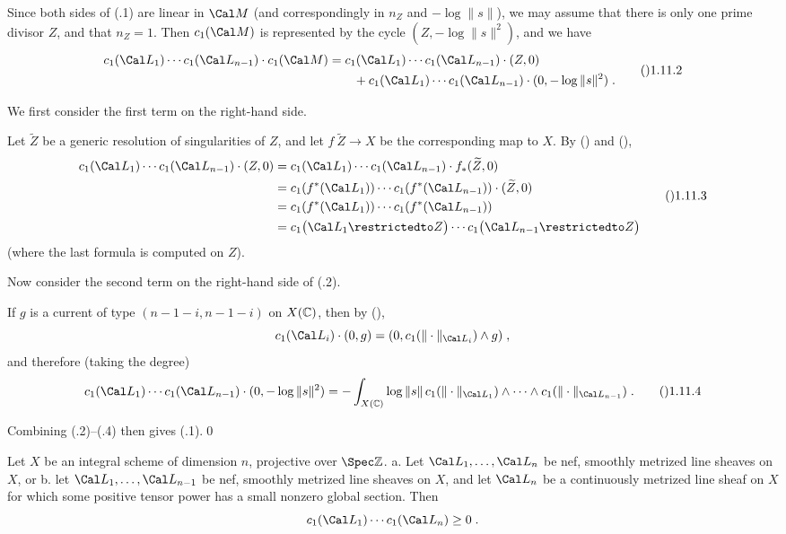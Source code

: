   Since both sides of (.1) are linear in $\Cal M$
(and correspondingly in $n_Z$ and $-\log\|s\|$), we may assume that
there is only one prime divisor $Z$, and that $n_Z=1$.  Then $c_1(\Cal M)$
is represented by the cycle $(Z,-\log\|s\|^2)$, and we have
$$\split c_1(\Cal L_1)\dotsm c_1(\Cal L_{n-1})\cdot c_1(\Cal M)
  &= c_1(\Cal L_1)\dotsm c_1(\Cal L_{n-1})\cdot (Z,0) \\
    &\qquad+ c_1(\Cal L_1)\dotsm c_1(\Cal L_{n-1})
      \cdot (0,-\log\|s\|^2)\;.\endsplit\tag\01.11.2$$

We first consider the first term on the right-hand side.

Let $\widetilde Z$ be a generic resolution of singularities of $Z$,
and let $f\:\widetilde Z\to X$ be the corresponding map to $X$.
By () and (),
$$\split c_1(\Cal L_1)\dotsm c_1(\Cal L_{n-1})\cdot (Z,0)
  &= c_1(\Cal L_1)\dotsm c_1(\Cal L_{n-1})\cdot f_{*}(\widetilde Z,0)\\
  &= c_1(f^{*}(\Cal L_1))\dotsm c_1(f^{*}(\Cal L_{n-1}))
    \cdot (\widetilde Z,0) \\
  &= c_1(f^{*}(\Cal L_1))\dotsm c_1(f^{*}(\Cal L_{n-1})) \\
  &= c_1\bigl(\Cal L_1\restrictedto Z\bigr) \dotsm
    c_1\bigl(\Cal L_{n-1}\restrictedto Z\bigr)\endsplit\tag\01.11.3$$
(where the last formula is computed on $Z$).

Now consider the second term on the right-hand side of (.2).

If $g$ is a current of type $(n-1-i,n-1-i)$ on $X(\Bbb C)$, then
by (),
$$c_1(\Cal L_i)\cdot(0,g) = (0,c_1(\|\cdot\|_{\Cal L_i})\wedge g)\;,$$
and therefore (taking the degree)
$$c_1(\Cal L_1)\dotsm c_1(\Cal L_{n-1}) \cdot (0,-\log\|s\|^2)
  = -\int_{X(\Bbb C)} \log\|s\|\,c_1(\|\cdot\|_{\Cal L_1})
      \wedge\dots\wedge c_1(\|\cdot\|_{\Cal L_{n-1}})\;.\tag\01.11.4$$

Combining (.2)--(.4) then gives (.1).\qed
\enddemo

  Let $X$ be an integral scheme of dimension $n$, projective
over $\Spec\Bbb Z$.
\roster
\myitem a.  Let $\Cal L_1,\dots,\Cal L_n$ be nef, smoothly metrized
  line sheaves on $X$, or
\myitem b.  let $\Cal L_1,\dots,\Cal L_{n-1}$ be nef, smoothly metrized
  line sheaves on $X$, and let $\Cal L_n$ be a continuously metrized line sheaf
  on $X$ for which some positive tensor power has a small nonzero
  global section.
\endroster
Then
$$c_1(\Cal L_1)\dotsm c_1(\Cal L_n) \ge 0\;.$$
\endit

